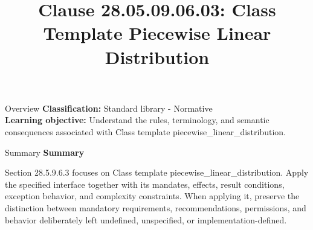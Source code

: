 \documentclass[10pt,letterpaper]{article}
\title{Clause 28.05.09.06.03: Class Template Piecewise Linear Distribution}
\author{}
\date{}
\begin{document}
\maketitle
\begin{CornellOverviewBox}{Overview}
\textbf{Classification:} Standard library - Normative\\[2pt]
\textbf{Learning objective:} Understand the rules, terminology, and semantic consequences associated with Class template piecewise\_linear\_distribution.
\end{CornellOverviewBox}\begin{CornellSummaryBox}{Summary}
{\sffamily\bfseries\color{Accent} Summary}\par\vspace{3pt}Section 28.5.9.6.3 focuses on Class template piecewise\_linear\_distribution. Apply the specified interface together with its mandates, effects, result conditions, exception behavior, and complexity constraints. When applying it, preserve the distinction between mandatory requirements, recommendations, permissions, and behavior deliberately left undefined, unspecified, or implementation-defined.
\end{CornellSummaryBox}
\end{document}
